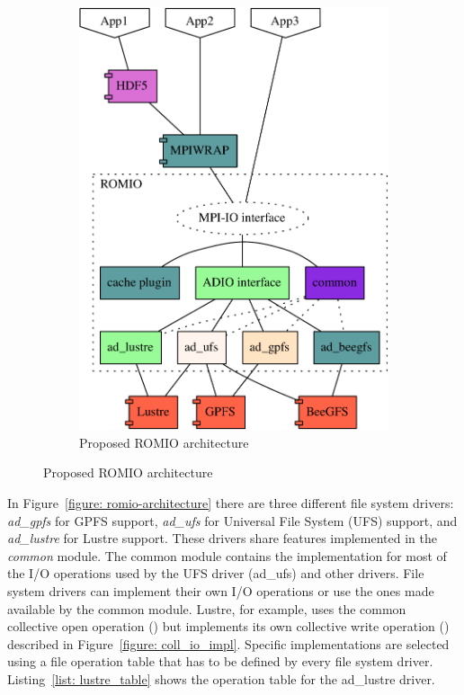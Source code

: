 \begin{figure}[!htb]
\begin{subfigure}[t]{0.55\textwidth}
  \includegraphics[width=\textwidth]{chapters/chapter3/figures/new-romio-architecture-src.pdf}
  \caption{Proposed ROMIO architecture}
  \label{figure: new-romio-architecture}
  \end{subfigure}
\end{figure}

In Figure~\ref{figure: romio-architecture} there are three different file system drivers: \textit{ad\_gpfs} for GPFS support, \textit{ad\_ufs} for Universal File System (UFS) support, and \textit{ad\_lustre} for Lustre support. These drivers share features implemented in the \textit{common} module. The common module contains the implementation for most of the I/O operations used by the UFS driver (ad\_ufs) and other drivers. File system drivers can implement their own I/O operations or use the ones made available by the common module. Lustre, for example, uses the common collective open operation () but implements its own collective write operation () described in Figure~\ref{figure: coll_io_impl}. Specific implementations are selected using a file operation table that has to be defined by every file system driver. Listing~\ref{list: lustre_table} shows the operation table for the ad\_lustre driver.

